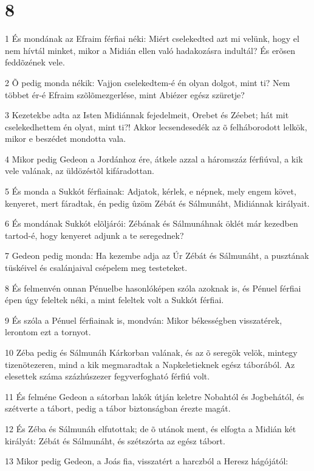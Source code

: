 \chapter{8}

\par 1 És mondának az Efraim férfiai néki: Miért cselekedted azt mi velünk, hogy el nem hívtál minket, mikor a Midián ellen való hadakozásra indultál? És erõsen feddõzének vele.
\par 2 Õ pedig monda nékik: Vajjon cselekedtem-é én olyan dolgot, mint ti? Nem többet ér-é Efraim szõlõmezgerlése, mint Abiézer egész szüretje?
\par 3 Kezetekbe adta az Isten Midiánnak fejedelmeit, Orebet és Zéebet; hát mit cselekedhettem én olyat, mint ti?! Akkor lecsendesedék az õ felháborodott lelkök, mikor e beszédet mondotta vala.
\par 4 Mikor pedig Gedeon a Jordánhoz ére, átkele azzal a háromszáz férfiúval, a kik vele valának, az üldözéstõl kifáradottan.
\par 5 És monda a Sukkót férfiainak: Adjatok, kérlek, e népnek, mely engem követ, kenyeret, mert fáradtak, én pedig ûzöm Zébát és Sálmunáht, Midiánnak királyait.
\par 6 És mondának Sukkót elõljárói: Zébának és Sálmunáhnak öklét már kezedben tartod-é, hogy kenyeret adjunk a te seregednek?
\par 7 Gedeon pedig monda: Ha kezembe adja az Úr Zébát és Sálmunáht, a pusztának tüskéivel és csalánjaival csépelem meg testeteket.
\par 8 És felmenvén onnan Pénuelbe hasonlóképen szóla azoknak is, és Pénuel férfiai épen úgy feleltek néki, a mint feleltek volt a Sukkót férfiai.
\par 9 És szóla a Pénuel férfiainak is, mondván: Mikor békességben visszatérek, lerontom ezt a tornyot.
\par 10 Zéba pedig és Sálmunáh Kárkorban valának, és az õ seregök velök, mintegy tizenötezeren, mind a kik megmaradtak a Napkeletieknek egész táborából. Az elesettek száma százhúszezer fegyverfogható férfiú volt.
\par 11 És felméne Gedeon a sátorban lakók útján keletre Nobahtól és Jogbehától, és szétverte a tábort, pedig a tábor biztonságban érezte magát.
\par 12 És Zéba és Sálmunáh elfutottak; de õ utánok ment, és elfogta a Midián két királyát: Zébát és Sálmunáht, és szétszórta az egész tábort.
\par 13 Mikor pedig Gedeon, a Joás fia, visszatért a harczból a Heresz hágójától:
